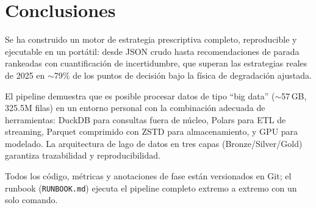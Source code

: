 \documentclass[conference]{IEEEtran}
\begin{document}
\section{Conclusiones}

Se ha construido un motor de estrategia prescriptiva completo, reproducible
y ejecutable en un portátil: desde JSON crudo hasta recomendaciones de
parada rankeadas con cuantificación de incertidumbre, que superan las
estrategias reales de 2025 en $\sim$79\% de los puntos de decisión bajo
la física de degradación ajustada.

El pipeline demuestra que es posible procesar datos de tipo ``big data''
($\sim$57\,GB, 325.5M filas) en un entorno personal con la combinación
adecuada de herramientas: DuckDB para consultas fuera de núcleo, Polars
para ETL de streaming, Parquet comprimido con ZSTD para almacenamiento,
y GPU para modelado. La arquitectura de lago de datos en tres capas
(Bronze/Silver/Gold) garantiza trazabilidad y reproducibilidad.

Todos los código, métricas y anotaciones de fase están versionados en
Git; el runbook (\texttt{RUNBOOK.md}) ejecuta el pipeline completo
extremo a extremo con un solo comando.
\end{document}
